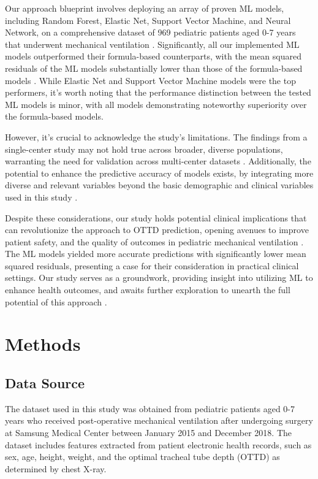 \documentclass[11pt]{article}
\begin{document}
Our approach blueprint involves deploying an array of proven ML models, including Random Forest, Elastic Net, Support Vector Machine, and Neural Network, on a comprehensive dataset of 969 pediatric patients aged 0-7 years that underwent mechanical ventilation \cite{Ingelse2017EarlyFO, Choi2022PredictionMF}. Significantly, all our implemented ML models outperformed their formula-based counterparts, with the mean squared residuals of the ML models substantially lower than those of the formula-based models \cite{Ming2019MachineLT, Zhou2022PredictionOE}. While Elastic Net and Support Vector Machine models were the top performers, it's worth noting that the performance distinction between the tested ML models is minor, with all models demonstrating noteworthy superiority over the formula-based models.

However, it's crucial to acknowledge the study's limitations. The findings from a single-center study may not hold true across broader, diverse populations, warranting the need for validation across multi-center datasets \cite{Ramsingh2020RelationshipBE}. Additionally, the potential to enhance the predictive accuracy of models exists, by integrating more diverse and relevant variables beyond the basic demographic and clinical variables used in this study \cite{Yan2020ImpactOC}.

Despite these considerations, our study holds potential clinical implications that can revolutionize the approach to OTTD prediction, opening avenues to improve patient safety, and the quality of outcomes in pediatric mechanical ventilation \cite{Kim2016PredictionOE, Liang2015ManagementOB}. The ML models yielded more accurate predictions with significantly lower mean squared residuals, presenting a case for their consideration in practical clinical settings. Our study serves as a groundwork, providing insight into utilizing ML to enhance health outcomes, and awaits further exploration to unearth the full potential of this approach \cite{Rajula2020ComparisonOC, Rost2022TrachealTM}.

\section*{Methods}

\subsection*{Data Source}
The dataset used in this study was obtained from pediatric patients aged 0-7 years who received post-operative mechanical ventilation after undergoing surgery at Samsung Medical Center between January 2015 and December 2018. The dataset includes features extracted from patient electronic health records, such as sex, age, height, weight, and the optimal tracheal tube depth (OTTD) as determined by chest X-ray.
\end{document}
